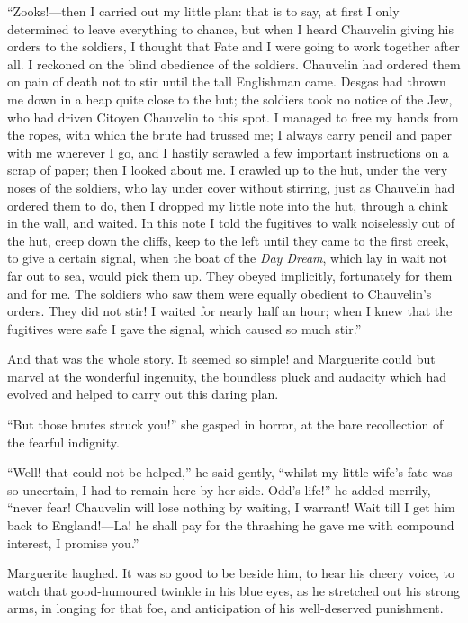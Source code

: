 \documentclass[paper=5.5in:8.5in,BCOR=7mm,twoside,DIV=calc,12pt,usegeometry,chapterprefix,endperiod,headings=big]{scrbook}
\begin{document}
\enquote{Zooks!---then I carried out my little plan: that is to say, at first I only determined to leave everything to chance, but when I heard Chauvelin giving his orders to the soldiers, I thought that Fate and I were going to work together after all. I reckoned on the blind obedience of the soldiers. Chauvelin had ordered them on pain of death not to stir until the tall Englishman came. Desgas had thrown me down in a heap quite close to the hut; the soldiers took no notice of the Jew, who had driven Citoyen Chauvelin to this spot. I managed to free my hands from the ropes, with which the brute had trussed me; I always carry pencil and paper with me wherever I go, and I hastily scrawled a few important instructions on a scrap of paper; then I looked about me. I crawled up to the hut, under the very noses of the soldiers, who lay under cover without stirring, just as Chauvelin had ordered them to do, then I dropped my little note into the hut, through a chink in the wall, and waited. In this note I told the fugitives to walk noiselessly out of the hut, creep down the cliffs, keep to the left until they came to the first creek, to give a certain signal, when the boat of the \textit{Day Dream}, which lay in wait not far out to sea, would pick them up. They obeyed implicitly, fortunately for them and for me. The soldiers who saw them were equally obedient to Chauvelin's orders. They did not stir! I waited for nearly half an hour; when I knew that the fugitives were safe I gave the signal, which caused so much stir.}

And that was the whole story. It seemed so simple! and Marguerite could but marvel at the wonderful ingenuity, the boundless pluck and audacity which had evolved and helped to carry out this daring plan.

\enquote{But those brutes struck you!} she gasped in horror, at the bare recollection of the fearful indignity.

\enquote{Well! that could not be helped,} he said gently, \enquote{whilst my little wife's fate was so uncertain, I had to remain here by her side. Odd's life!} he added merrily, \enquote{never fear! Chauvelin will lose nothing by waiting, I warrant! Wait till I get him back to England!---La! he shall pay for the thrashing he gave me with compound interest, I promise you.}

Marguerite laughed. It was so good to be beside him, to hear his cheery voice, to watch that good-humoured twinkle in his blue eyes, as he stretched out his strong arms, in longing for that foe, and anticipation of his well-deserved punishment.
\end{document}
